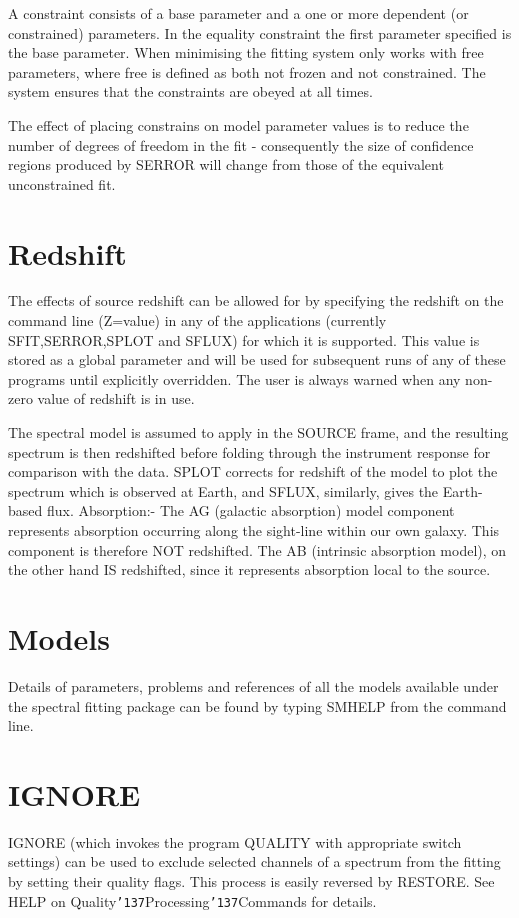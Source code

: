 \documentclass{book}
\renewcommand{\_}{{\tt\char'137}}     %
\begin{document}
A constraint consists of a base parameter and a one or more dependent
(or constrained) parameters. In the equality constraint the first
parameter specified is the base parameter. When minimising the fitting
system only works with free parameters, where free is defined as both
not frozen and not constrained. The system ensures that the constraints
are obeyed at all times.
 
The effect of placing constrains on model parameter values is to
reduce the number of degrees of freedom in the fit - consequently the
size of confidence regions produced by SERROR will change from those
of the equivalent unconstrained fit.
 
\section{Redshift}
The effects of source redshift can be allowed for by specifying
the redshift on the command line (Z=value) in any of the
applications (currently SFIT,SERROR,SPLOT and SFLUX) for which it
is supported. This value is stored as a global parameter and will
be used for subsequent runs of any of these programs until
explicitly overridden. The user is always warned when any non-zero
value of redshift is in use.
 
The spectral model is assumed to apply in the SOURCE frame, and
the resulting spectrum is then redshifted before folding through
the instrument response for comparison with the data. SPLOT
corrects for redshift of the model to plot the spectrum which is
observed at Earth, and SFLUX, similarly, gives the Earth-based
flux.
Absorption:-
The AG (galactic absorption) model component represents absorption
occurring along the sight-line within our own galaxy. This component
is therefore NOT redshifted. The AB (intrinsic absorption model), on
the other hand IS redshifted, since it represents absorption local
to the source.
\section{Models}
Details of parameters, problems and references of all the models
available under the spectral fitting package can be found by typing
SMHELP from the command line.
\section{IGNORE}
IGNORE (which invokes the program QUALITY with appropriate switch
settings) can be used to exclude selected channels of a spectrum
from the fitting by setting their quality flags. This process is
easily reversed by RESTORE.
See HELP on Quality\_Processing\_Commands for details.
\end{document}
